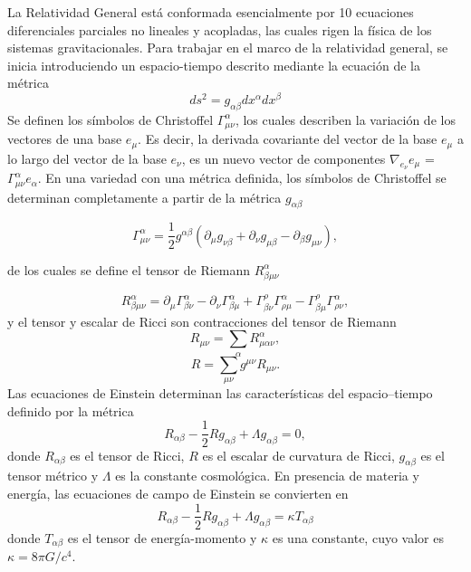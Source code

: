 \documentclass[a4paper,openright,12pt]{book}
\begin{document}
La Relatividad General está conformada esencialmente por 10 ecuaciones diferenciales parciales no lineales y acopladas, las cuales rigen la física de los sistemas gravitacionales. Para trabajar en el marco de la relatividad general, se inicia introduciendo un espacio-tiempo descrito mediante la ecuación de la métrica
\begin{equation}
ds^{2}=g_{\alpha \beta}dx^{\alpha}dx^{\beta}\label{eqn 1.11}
\end{equation}
Se definen los símbolos de Christoffel $\Gamma^{\alpha}_{\mu \nu}$, los cuales describen la variación de los vectores de una base $e_{\mu}$. Es decir, la derivada covariante del vector de la base $e_{\mu}$ a lo largo del vector de la base $e_{\nu}$, es un nuevo vector de componentes $\nabla_{e_{\nu}}e_{\mu}$ = $\Gamma^{\alpha}_{\mu \nu} e_{\alpha}$. En una variedad con una métrica definida, los símbolos de Christoffel se determinan completamente a partir de la métrica $g_{\alpha \beta}$ \cite{1.4}

\begin{equation*}
\Gamma^{\alpha}_{\mu \nu} = 
\frac{1}{2}g^{\alpha \beta}\left(\partial_{\mu}g_{\nu \beta} +
\partial_{\nu}g_{\mu \beta} - \partial_{\beta}g_{\mu \nu}\right), 
\end{equation*}

de los cuales se define el tensor de Riemann $R^{\alpha}_{\beta \mu \nu}$

\begin{equation*}
R^{\alpha}_{\beta \mu \nu}
=
\partial_{\mu}\Gamma^{\alpha}_{\beta \nu}
-
\partial_{\nu}\Gamma^{\alpha}_{\beta \mu}
+
\Gamma^{\rho}_{\beta \nu}\Gamma^{\alpha}_{\rho \mu}
-
\Gamma^{\rho}_{\beta \mu}\Gamma^{\alpha}_{\rho \nu},
\end{equation*}
y el tensor y escalar de Ricci son contracciones del tensor de Riemann
\begin{equation*}
R_{\mu \nu} = \sum_{\alpha}R^{\alpha}_{\mu \alpha \nu},
\end{equation*}
\begin{equation*}
R = \sum_{\mu \nu}g^{\mu \nu}R_{\mu \nu}.
\end{equation*}
Las ecuaciones de Einstein determinan las características del espacio--tiempo definido por la métrica
\begin{equation}
R_{\alpha \beta} - \frac{1}{2} R g_{\alpha \beta} + \Lambda g_{\alpha \beta} = 0,\label{eqn 1.12}
\end{equation}
donde $R_{\alpha \beta}$ es el tensor de Ricci, $R$ es el escalar de curvatura de Ricci, $g_{\alpha \beta}$ es el tensor métrico y $\Lambda$ es la constante cosmológica. En presencia de materia y energía, las ecuaciones de campo de Einstein se convierten en 
\begin{equation}
R_{\alpha \beta} - \frac{1}{2} R g_{\alpha \beta} + \Lambda g_{\alpha \beta} = \kappa T_{\alpha \beta}\label{eqn 1.13}
\end{equation}
donde $T_{\alpha \beta}$ es el tensor de energía-momento y $\kappa$ es una constante, cuyo valor es $\kappa = 8 \pi G / c^{4}$.
\end{document}
